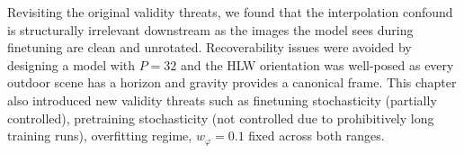 \documentclass[final_report.tex]{subfiles}
\begin{document}
Revisiting the original validity threats, we found that the interpolation confound is structurally irrelevant downstream as the images the model sees during finetuning are clean and unrotated. Recoverability issues were avoided by designing a model with $P=32$ and the HLW orientation was well-posed as every outdoor scene has a horizon and gravity provides a canonical frame. This chapter also introduced new validity threats such as finetuning stochasticity (partially controlled), pretraining stochasticity (not controlled due to prohibitively long training runs), overfitting regime, $w_\varphi=0.1$ fixed across both ranges.

\ifSubfilesClassLoaded{\pagebreak\printbibliography}{}
\end{document}

